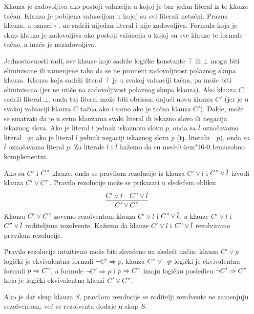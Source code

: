 \documentclass[12pt, a4paper, titlepage, twoside]{article}
\theoremstyle{definition}
\def\dj{d\kern-0.4em\char"16\kern-0.1em}
\begin{document}
Klauza je zadovoljiva ako postoji valuacija u kojoj je bar jedan literal iz
te klauze ta\v can. Klauza je pobijena valuacijom u kojoj su svi literali neta\v cni.
Prazna klauza, u oznaci $\square$ , ne sadr\v zi nijedan literal i nije zadovoljiva. Formula
koja je skup klauza je zadovoljiva ako postoji valuacija u kojoj su sve klauze te
formule ta\v cne, a ina\v ce je nezadovoljiva.


Jednostavnosti radi, sve klauze koje sadr\v ze logi\v cke konstante $\top$ ili $\bot$ mogu
biti eliminisane ili zamenjene tako da se ne promeni zadovoljivost polaznog
skupa klauza. Klauza koja sadr\v zi literal $\top$ je u svakoj valuaciji ta\v cna, pa mo\v ze 
biti eliminisana (jer ne uti\v ce na zadovoljivost polaznog skupa klauza). Ako
klauza $C$ sadr\v zi literal $\bot$, onda taj literal mo\v ze biti obrisan, daju\'ci novu klauzu
$C'$ (jer je u svakoj valuaciji klauza $C$ ta\v cna ako i samo ako je ta\v cna klauza $C'$).
Dakle, mo\v ze se smatrati da je u svim klauzama svaki literal ili iskazno slovo
ili negacija iskaznog slova. Ako je literal $l$ jednak iskaznom slovu $p$, onda
sa $\overline{l}$ ozna\v cavamo literal $\neg p$; ako je literal $l$ jednak negaciji iskaznog 
slova $p$ (tj. literalu $ \neg p $), onda sa $\overline{l}$ ozna\v cavamo literal $p$. Za 
literale $l$ i $\overline{l}$ ka\v zemo da su me\dj{}usobno komplementni.


Ako su $C'$ i $C"$ klauze, onda se pravilom rezolucije iz klauza $C' \lor l$ i 
$C" \lor \overline{l}$ izvodi klauza $C' \lor C"$. Pravilo rezolucije mo\v ze se prikazati 
u slede\'cem obliku:
$$\frac{C' \lor l \quad C" \lor \overline{l}}{C' \lor C"}$$
Klauzu $C' \lor C"$ zovemo rezolventom klauza $C' \lor l$ i $C" \lor \overline{l}$,
a klauze $C' \lor l$ i $C" \lor \overline{l}$ roditeljima rezolvente. Ka\v zemo da klauze 
$C' \lor l$ i $C" \lor \overline{l}$ rezolviramo pravilom rezolucije.


Pravilo rezolucije intuitivno mo\v ze biti shva\'ceno na slede\'ci na\v cin: klauza $C' \lor p$ 
logi\v cki je ekvivalentna formuli $\neg C' \Rightarrow p$, klauza $C" \lor \neg p$ 
logi\v cki je ekvivalentna formuli $p \Rightarrow C"$, a formule $\neg C' \Rightarrow p$ i 
$p \Rightarrow C"$ imaju logi\v cku posledicu $\neg C' \Rightarrow C"$ koja je logi\v cki 
ekvivalentna klauzi $C' \lor C"$.


Ako je dat skup klauza $S$, pravilom rezolucije se roditelji rezolvente ne zamenjuju
rezolventom, ve\'c se rezolventa dodaje u skup $S$.
\end{document}
